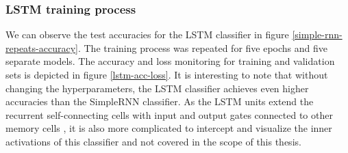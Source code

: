 \subsubsection{LSTM training process} 

We can observe the test accuracies for the LSTM classifier in figure \ref{simple-rnn-repeats-accuracy}. The training process was repeated for five epochs and five separate models. The accuracy and loss monitoring for training and validation sets is depicted in figure \ref{lstm-acc-loss}. It is interesting to note that without changing the hyperparameters, the LSTM classifier achieves even higher accuracies than the SimpleRNN classifier. As the LSTM units extend the recurrent self-connecting cells with input and output gates connected to other memory cells \cite{staudemeyer2019understanding}, it is also more complicated to intercept and visualize the inner activations of this classifier and not covered in the scope of this thesis.  

